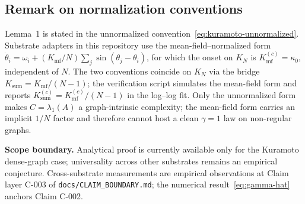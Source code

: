\subsection{Remark on normalization conventions}
\label{sec:lemma1-convention}

Lemma~1 is stated in the unnormalized convention~\eqref{eq:kuramoto-unnormalized}. Substrate adapters in this repository use the mean-field--normalized form $\dot\theta_i = \omega_i + (K_\mathrm{mf}/N)\sum_j \sin(\theta_j - \theta_i)$, for which the onset on $K_N$ is $K_\mathrm{mf}^{(c)} = \kappa_0$, independent of $N$. The two conventions coincide on $K_N$ via the bridge $K_\mathrm{sum} = K_\mathrm{mf}/(N-1)$; the verification script simulates the mean-field form and reports $K_\mathrm{sum}^{(c)} = K_\mathrm{mf}^{(c)}/(N-1)$ in the log--log fit. Only the unnormalized form makes $C = \lambda_1(A)$ a graph-intrinsic complexity; the mean-field form carries an implicit $1/N$ factor and therefore cannot host a clean $\gamma = 1$ law on non-regular graphs.

\medskip
\noindent\textbf{Scope boundary.}
Analytical proof is currently available only for the Kuramoto dense-graph case; universality across other substrates remains an empirical conjecture. Cross-substrate measurements are empirical observations at Claim layer C-003 of \texttt{docs/CLAIM\_BOUNDARY.md}; the numerical result~\eqref{eq:gamma-hat} anchors Claim C-002.

